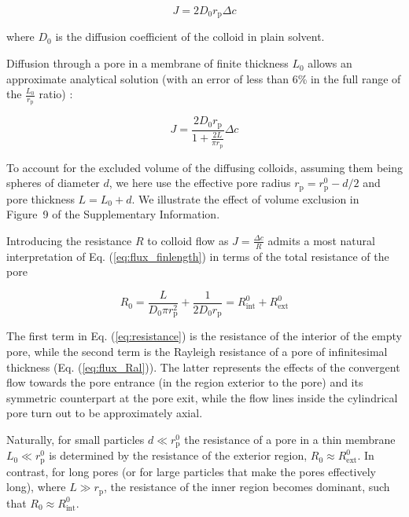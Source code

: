 \documentclass[12pt, a4paper]{article}
\begin{document}
\begin{equation}
    J=2D_0r_{\text{p}}\Delta c
    \label{eq:flux_Ral}
\end{equation}

\noindent where $D_0$ is the diffusion coefficient of the colloid in plain solvent. 

Diffusion through a pore in a membrane of finite thickness $L_{0}$ allows an approximate analytical solution (with an error of less than 6\% in the full range of the $\frac{L_{0}}{r_{\text{p}}}$ ratio) \cite{Brunn1984}: 

\begin{equation}
    J=\frac{2D_0r_{\text{p}}}{1+\frac{2L}{\pi r_{\text{p}}}}\Delta c
    \label{eq:flux_finlength}
\end{equation}

\noindent To account for the excluded volume of the diffusing colloids, assuming them being spheres of diameter $d$, we here use the effective pore radius $r_{\text{p}}=r_{\text{p}}^{0}-d/2$ and pore thickness $L = L_{0} + d$.
We illustrate the effect of volume exclusion in Figure~9 of the Supplementary Information.

Introducing the resistance $R$ to colloid flow as $J=\frac{\Delta c}{R}$ admits a most natural interpretation of Eq. (\ref{eq:flux_finlength}) in terms of the total resistance of the pore

\begin{equation}
    R_{0}=\frac{L}{D_0\pi r_{\text{p}}^{2}}+\frac{1}{2D_0r_{\text{p}}}=R_{\text{int}}^{0}+R_{\text{ext}}^{0}
    \label{eq:resistance}
\end{equation}

\noindent The first term in Eq. (\ref{eq:resistance}) is the resistance of the interior of the empty pore, while the second term is the Rayleigh resistance of a pore of infinitesimal thickness (Eq. (\ref{eq:flux_Ral})). 
The latter represents the effects of the convergent flow towards the pore entrance (in the region exterior to the pore) and its symmetric counterpart at the pore exit, while the flow lines inside the cylindrical pore turn out to be approximately axial.

Naturally, for small particles $d \ll r_{\text{p}}^{0}$ the resistance of a pore in a thin membrane $L_{0} \ll r_{\text{p}}^{0}$ is determined by the resistance of the exterior region, $R_{0} \approx R_{\text{ext}}^{0}$.
In contrast, for long pores (or for large particles that make the pores effectively long), where $L \gg r_{\text{p}}$, the resistance of the inner region becomes dominant, such that $R_{0} \approx R_{\text{int}}^{0}$.
\end{document}
